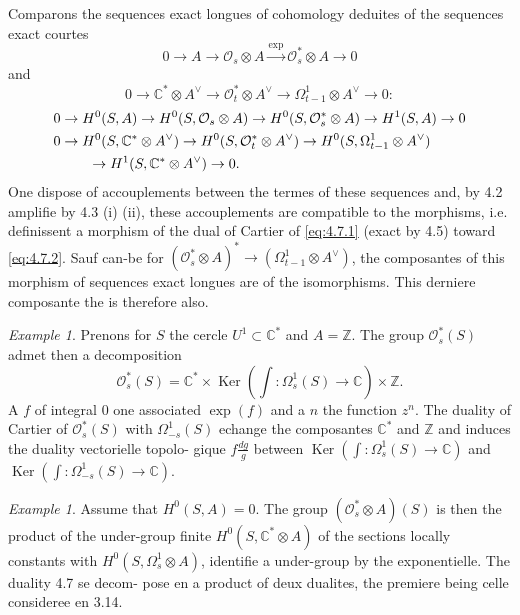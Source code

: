 \documentclass[12pt,a4paper]{article}
\theoremstyle{plain}
\theoremstyle{definition}
\theoremstyle{remark}
\newtheorem{example}[theorem]{Example}
\DeclareMathOperator{\Ker}{Ker}
\newcommand{\cO}{\mathcal{O}}
\newcommand{\Z}{\mathbb{Z}}
\newcommand{\C}{\mathbb{C}}
\providecommand{\cO}{\mathcal{O}}
\providecommand{\Ker}{\operatorname{Ker}}
\begin{document}
Comparons the sequences exact longues of cohomology deduites of the sequences exact
courtes
\[
0 \to A \to \cO_s \otimes A \xrightarrow{\exp} \cO_s^* \otimes A \to 0
\]
and
\[
0 \to \C^* \otimes A^\vee \to \cO_t^* \otimes A^\vee \to \Omega^1_{t-1} \otimes A^\vee \to 0 :
\]
\begin{align}
0 &\to H^0(S, A) \to H^0(S, \cO_s \otimes A) \to H^0(S, \cO_s^* \otimes A) \to H^1(S, A) \to 0 \label{eq:4.7.1} \\
0 &\to H^0(S, \C^* \otimes A^\vee) \to H^0(S, \cO_t^* \otimes A^\vee) \to H^0(S, \Omega^1_{t-1} \otimes A^\vee) \notag \\
&\qquad \to H^1(S, \C^* \otimes A^\vee) \to 0. \label{eq:4.7.2}
\end{align}
One dispose of accouplements between the termes of these sequences and, by 4.2 amplifie by 4.3 (i)
(ii), these accouplements are compatible to the morphisms, i.e. definissent a morphism
of the dual of Cartier of \eqref{eq:4.7.1} (exact by 4.5) toward \eqref{eq:4.7.2}. Sauf can-be for
$(\cO_s^* \otimes A)^* \to (\Omega^1_{t-1} \otimes A^\vee)$, the composantes of this morphism of sequences exact longues are
of the isomorphisms. This derniere composante the is therefore also.

\begin{example}
Prenons for $S$ the cercle $U^1 \subset \C^*$ and $A = \Z$. The group $\cO_s^*(S)$
admet then a decomposition
\[
\cO_s^*(S) = \C^* \times \Ker\left(\int : \Omega^1_s(S) \to \C\right) \times \Z.
\]
A $f$ of integral $0$ one associated $\exp(f)$ and a $n$ the function $z^n$. The duality of Cartier of $\cO_s^*(S)$
with $\Omega^1_{-s}(S)$ echange the composantes $\C^*$ and $\Z$ and induces the duality vectorielle topolo-
gique $f \frac{dg}{g}$ between $\Ker(\int : \Omega^1_s(S) \to \C)$ and $\Ker(\int : \Omega^1_{-s}(S) \to \C)$.
\end{example}

\begin{example}
Assume that $H^0(S, A) = 0$. The group $(\cO_s^* \otimes A)(S)$ is then the
product of the under-group finite $H^0(S, \C^* \otimes A)$ of the sections locally constants with
$H^0(S, \Omega_s^1 \otimes A)$, identifie a under-group by the exponentielle. The duality 4.7 se decom-
pose en a product of deux dualites, the premiere being celle consideree en 3.14.
\end{example}

\subsection{}
\end{document}
